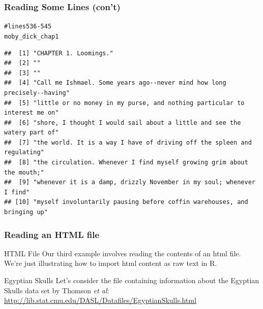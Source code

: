 \documentclass{beamer}\usepackage[]{graphicx}\usepackage[]{color}
\makeatletter
\newcommand{\hlcom}[1]{\textcolor[rgb]{0.588,0.588,0.588}{#1}}%
\newcommand{\hlstd}[1]{\textcolor[rgb]{0.196,0.196,0.196}{#1}}%
\newenvironment{kframe}{%
 \def\at@end@of@kframe{}%
 \ifinner\ifhmode%
  \def\at@end@of@kframe{\end{minipage}}%
  \begin{minipage}{\columnwidth}%
 \fi\fi%
 \def\FrameCommand##1{\hskip\@totalleftmargin \hskip-\fboxsep
 \colorbox{shadecolor}{##1}\hskip-\fboxsep
     \hskip-\linewidth \hskip-\@totalleftmargin \hskip\columnwidth}%
 \MakeFramed {\advance\hsize-\width
   \@totalleftmargin\z@ \linewidth\hsize
   \@setminipage}}%
 {\par\unskip\endMakeFramed%
 \at@end@of@kframe}
\newenvironment{knitrout}{}{} %
\makeatother
\begin{document}
\begin{frame}[fragile]
\frametitle{Reading Some Lines (con't)}

\begin{knitrout}\tiny
{}\color{fgcolor}\begin{kframe}
\begin{alltt}
\hlcom{# lines 536-545}
\hlstd{moby_dick_chap1}
\end{alltt}
\begin{verbatim}
##  [1] "CHAPTER 1. Loomings."                                                    
##  [2] ""                                                                        
##  [3] ""                                                                        
##  [4] "Call me Ishmael. Some years ago--never mind how long precisely--having"  
##  [5] "little or no money in my purse, and nothing particular to interest me on"
##  [6] "shore, I thought I would sail about a little and see the watery part of" 
##  [7] "the world. It is a way I have of driving off the spleen and regulating"  
##  [8] "the circulation. Whenever I find myself growing grim about the mouth;"   
##  [9] "whenever it is a damp, drizzly November in my soul; whenever I find"     
## [10] "myself involuntarily pausing before coffin warehouses, and bringing up"
\end{verbatim}
\end{kframe}
\end{knitrout}

\end{frame}


\begin{frame}[fragile]
\frametitle{Reading an HTML file}

\begin{block}{HTML File}
Our third example involves reading the contents of an html file. We're just illustrating how to import html content as raw text in R. \\
\end{block}

\begin{block}{Egyptian Skulls}
Let's consider the file containing information about the Egyptian Skulls data set by Thomson \textit{et al}: \\
{ \footnotesize \url{http://lib.stat.cmu.edu/DASL/Datafiles/EgyptianSkulls.html}}
\end{block}

\end{frame}
\end{document}
